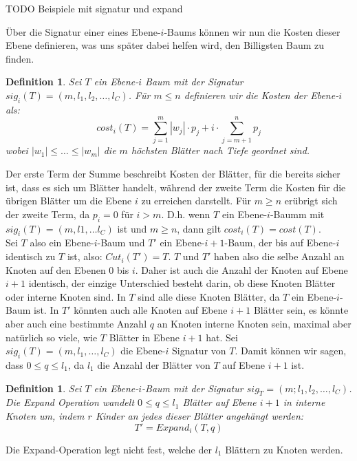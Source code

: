 \documentclass[a4paper,10pt,ngerman]{scrartcl}
\newtheorem{definition}[satz]{Definition}
\begin{document}
    TODO Beispiele mit signatur und expand

    Über die Signatur einer eines Ebene-$i$-Baums können wir nun die Kosten dieser Ebene definieren, was uns später dabei helfen wird, den \glqq Billigsten\grqq{} Baum zu finden.
    \begin{definition}
        Sei $T$ ein Ebene-$i$ Baum mit der Signatur $sig_i(T) = (m, l_1, l_2, \dots, l_C)$. Für $m \le n$ definieren wir die Kosten der Ebene-$i$ als:
        \[cost_i(T) = \sum^m_{j=1} |w_j| \cdot p_j + i \cdot \sum^n_{j=m + 1}p_j\]
        wobei $|w_1| \le \dots \le |w_m|$ die $m$ höchsten Blätter nach Tiefe geordnet sind.
    \end{definition}
    Der erste Term der Summe beschreibt Kosten der Blätter, für die bereits sicher ist, dass es sich um Blätter handelt, während der zweite Term die Kosten für die übrigen Blätter um die Ebene $i$ zu erreichen darstellt.
    Für $m \ge n$ erübrigt sich der zweite Term, da $p_i = 0$ für $i > m$. D.h. wenn $T$ ein Ebene-$i$-Baumm mit $sig_i(T) = (m, l1, \dots l_C)$ ist und $m \ge n$, dann gilt $cost_i(T) = cost(T)$. \\
    Sei $T$ also ein Ebene-$i$-Baum und $T'$ ein Ebene-$i+1$-Baum, der bis auf Ebene-$i$ identisch zu $T$ ist, also: $Cut_i(T') = T$. $T$ und $T'$ haben also die selbe Anzahl an Knoten auf den Ebenen $0$ bis $i$. Daher ist auch die Anzahl der Knoten auf Ebene $i+1$ identisch, der einzige Unterschied besteht darin, ob diese Knoten Blätter oder interne Knoten sind. In $T$ sind alle diese Knoten Blätter, da $T$ ein Ebene-$i$-Baum ist. In $T'$ könnten auch alle Knoten auf Ebene $i+1$ Blätter sein, es könnte aber auch eine bestimmte Anzahl $q$ an Knoten interne Knoten sein, maximal aber natürlich so viele, wie $T$ Blätter in Ebene $i+1$ hat. Sei $sig_i(T) = (m, l_1, \dots, l_C)$ die Ebene-$i$ Signatur von $T$. Damit können wir sagen, dass $0 \le q \le l_1$, da $l_1$ die Anzahl der Blätter von $T$ auf Ebene $i+1$ ist.
    \begin{definition}
        Sei $T$ ein Ebene-$i$-Baum mit der Signatur $sig_T = (m;l_1,l_2,\dots,l_C)$. Die Expand Operation wandelt $0 \le q \le l_1$ Blätter auf Ebene $i + 1$ in interne Knoten um, indem $r$ Kinder an jedes dieser Blätter angehängt werden:
        \[T' = Expand_i(T, q)\]
    \end{definition}
    Die Expand-Operation legt nicht fest, welche der $l_1$ Blättern zu Knoten werden.
\end{document}
